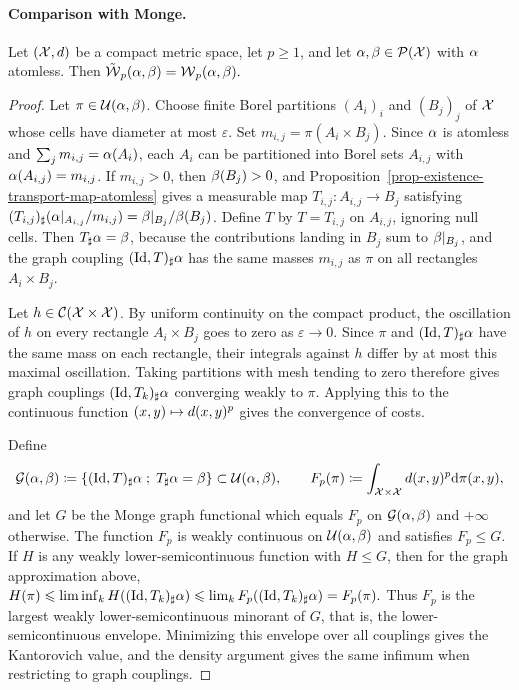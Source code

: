 \paragraph{Comparison with Monge.}
\begin{prop}\label{prop-kantorovich-relaxation-monge}
Let $(\mathcal{X},d)$ be a compact metric space, let $p\geq1$, and let $\alpha,\beta\in\mathcal{P}(\mathcal{X})$ with $\alpha$ atomless. Then
\(\tilde{\operatorname{\mathcal{W}}}_p(\alpha,\beta)=\operatorname{\mathcal{W}}_p(\alpha,\beta).\)
\end{prop}
\begin{proof}
Let $\pi\in\mathcal{U}(\alpha,\beta)$. Choose finite Borel partitions $(A_i)_i$ and $(B_j)_j$ of $\mathcal{X}$ whose cells have diameter at most $\varepsilon$. Set $m_{i,j}=\pi(A_i\times B_j)$. Since $\alpha$ is atomless and $\sum_j m_{i,j}=\alpha(A_i)$, each $A_i$ can be partitioned into Borel sets $A_{i,j}$ with $\alpha(A_{i,j})=m_{i,j}$. If $m_{i,j}>0$, then $\beta(B_j)>0$, and Proposition~\ref{prop-existence-transport-map-atomless} gives a measurable map
$T_{i,j}:A_{i,j}\to B_j$ satisfying
$(T_{i,j})_\sharp(\alpha|_{A_{i,j}}/m_{i,j})=\beta|_{B_j}/\beta(B_j)$.
Define $T$ by $T=T_{i,j}$ on $A_{i,j}$, ignoring null cells. Then $T_\sharp\alpha=\beta$, because the contributions landing in $B_j$ sum to $\beta|_{B_j}$, and the graph coupling $(\mathrm{Id},T)_\sharp\alpha$ has the same masses $m_{i,j}$ as $\pi$ on all rectangles $A_i\times B_j$.

Let $h\in\mathcal{C}(\mathcal{X}\times\mathcal{X})$. By uniform continuity on the compact product, the oscillation of $h$ on every rectangle $A_i\times B_j$ goes to zero as $\varepsilon\to0$. Since $\pi$ and $(\mathrm{Id},T)_\sharp\alpha$ have the same mass on each rectangle, their integrals against $h$ differ by at most this maximal oscillation. Taking partitions with mesh tending to zero therefore gives graph couplings $(\mathrm{Id},T_k)_\sharp\alpha$ converging weakly to $\pi$. Applying this to the continuous function $(x,y)\mapsto d(x,y)^p$ gives the convergence of costs.

Define
\[
\mathcal G(\alpha,\beta)
\coloneqq
\left\{ (\mathrm{Id},T)_\sharp\alpha \;;\; T_\sharp\alpha=\beta \right\}
\subset\mathcal{U}(\alpha,\beta),
\qquad
F_p(\pi)\coloneqq\int_{\mathcal{X}\times\mathcal{X}}d(x,y)^p\mathrm{d}\pi(x,y),
\]
and let $G$ be the Monge graph functional which equals $F_p$ on $\mathcal G(\alpha,\beta)$ and $+\infty$ otherwise. The function $F_p$ is weakly continuous on $\mathcal{U}(\alpha,\beta)$ and satisfies $F_p\leq G$. If $H$ is any weakly lower-semicontinuous function with $H\leq G$, then for the graph approximation above,
\(H(\pi)\leqslant\liminf_k H((\mathrm{Id},T_k)_\sharp\alpha) \leqslant \lim_k F_p((\mathrm{Id},T_k)_\sharp\alpha)=F_p(\pi).\)
Thus $F_p$ is the largest weakly lower-semicontinuous minorant of $G$, that is, the lower-semicontinuous envelope. Minimizing this envelope over all couplings gives the Kantorovich value, and the density argument gives the same infimum when restricting to graph couplings.
\end{proof}
